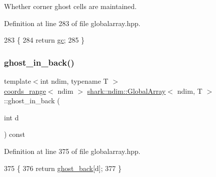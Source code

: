 Whether corner ghost cells are maintained. 

Definition at line 283 of file globalarray.\+hpp.


\begin{DoxyCode}
283                                                              \{
284             \textcolor{keywordflow}{return} \hyperlink{classshark_1_1ndim_1_1_global_array_a100f4d523420deffde330079df7501e2}{gc};
285         \}
\end{DoxyCode}
\hypertarget{classshark_1_1ndim_1_1_global_array_a55074d9d00de584f5817668e0c69f58a}{}\label{classshark_1_1ndim_1_1_global_array_a55074d9d00de584f5817668e0c69f58a} 
\subsubsection{\texorpdfstring{ghost\+\_\+in\+\_\+back()}{ghost\_in\_back()}}
{\footnotesize\ttfamily template$<$int ndim, typename T $>$ \\
\hyperlink{structshark_1_1ndim_1_1coords__range}{coords\+\_\+range}$<$ ndim $>$ \hyperlink{classshark_1_1ndim_1_1_global_array}{shark\+::ndim\+::\+Global\+Array}$<$ ndim, T $>$\+::ghost\+\_\+in\+\_\+back (\begin{DoxyParamCaption}\item[{int}]{d }\end{DoxyParamCaption}) const\hspace{0.3cm}{\ttfamily [inline]}}



Definition at line 375 of file globalarray.\+hpp.


\begin{DoxyCode}
375                                                                                 \{
376                     \textcolor{keywordflow}{return} \hyperlink{classshark_1_1ndim_1_1_global_array_a97eb47a8cd80d98627706e673259a310}{ghost\_back}[d];
377                 \}
\end{DoxyCode}
\hypertarget{classshark_1_1ndim_1_1_global_array_a8432959070aee7062f09cae8e7f20097}{}\label{classshark_1_1ndim_1_1_global_array_a8432959070aee7062f09cae8e7f20097} 
